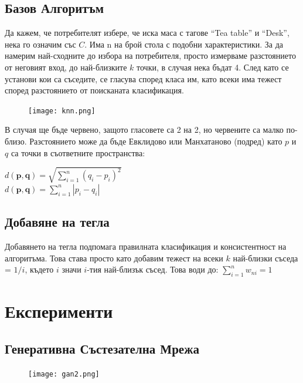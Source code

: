\subsection{Базов Алгоритъм}
Да кажем, че потребителят избере, че иска маса с тагове ``Tea table'' и ``Desk'', нека го означим със $C$. Има n на брой стола с подобни характеристики. За да намерим най-сходните до избора на потребителя, просто измерваме разстоянието от неговият вход, до най-близките $k$ точки, в случая нека бъдат 4. След като се установи кои са съседите, се гласува според класа им, като всеки има тежест според разстоянието от поисканата класификация.\\
\begin{center}
\begin{figure}[h]
    \centering
    \texttt{[image: knn.png]}
\end{figure}
\end{center}
В случая ще бъде червено, защото гласовете са 2 на 2, но червените са малко по-близо.
Разстоянието може да бъде Евклидово или Манхатаново (подред) като $p$ и $q$ са точки в съответните пространства:
\begin{center}
$d(\mathbf {p},\mathbf {q})=\sqrt{\sum_{i=1}^n (q_i-p_i)^2}$\\
$d(\mathbf {p} ,\mathbf {q} )=\sum _{i=1}^{n}|p_{i}-q_{i}|$\\
\end{center}

\subsection{Добавяне на тегла}
Добавянето на тегла подпомага правилната класификация и консистентност на алгоритъма. Това става просто като добавим тежест на всеки $k$ най-близки съседа = $1/i$, където $i$ значи $i$-тия най-близък съсед. Това води до: $\sum _{{i=1}}^{n}w_{{ni}}=1$

\newline
\section{Експерименти}
\subsection{Генеративна Състезателна Мрежа}

\begin{figure}
\texttt{[image: gan2.png]}
\end{figure} 

